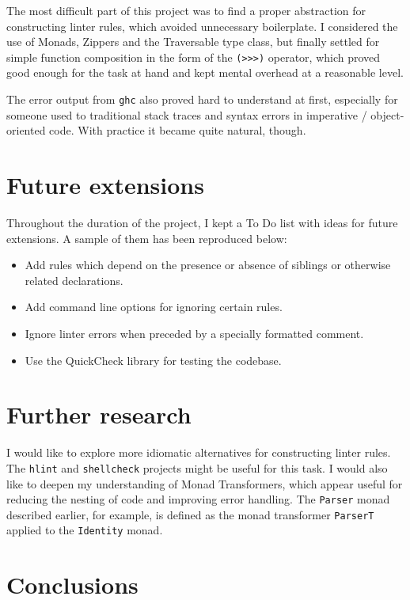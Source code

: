 \documentclass[]{article}
\providecommand{\tightlist}{%
  \setlength{\itemsep}{0pt}\setlength{\parskip}{0pt}}
\begin{document}
The most difficult part of this project was to find a proper abstraction
for constructing linter rules, which avoided unnecessary boilerplate. I
considered the use of Monads, Zippers and the Traversable type
class, but finally settled for simple function composition in the form
of the \texttt{(>>>)} operator, which proved good enough for the task
at hand and kept mental overhead at a reasonable level.

The error output from \texttt{ghc} also proved hard to understand at
first, especially for someone used to traditional stack traces and
syntax errors in imperative / object-oriented code. With practice it
became quite natural, though.

\section{Future extensions}\label{future-extensions}

Throughout the duration of the project, I kept a To Do list with ideas
for future extensions. A sample of them has been reproduced below:

\begin{itemize}
\tightlist
\item
  Add rules which depend on the presence or absence of siblings or
  otherwise related declarations.
\item
  Add command line options for ignoring certain rules.
\item
  Ignore linter errors when preceded by a specially formatted comment.
\item
  Use the QuickCheck library for testing the codebase.
\end{itemize}

\section{Further research}\label{further-research}

I would like to explore more idiomatic alternatives for constructing
linter rules. The \texttt{hlint} and \texttt{shellcheck} projects might
be useful for this task. I would also like to deepen my understanding of
Monad Transformers, which appear useful for reducing the nesting of code
and improving error handling. The \texttt{Parser} monad described earlier,
for example, is defined as the monad transformer \texttt{ParserT} applied
to the \texttt{Identity} monad.

\section{Conclusions}\label{conclusions}
\end{document}
